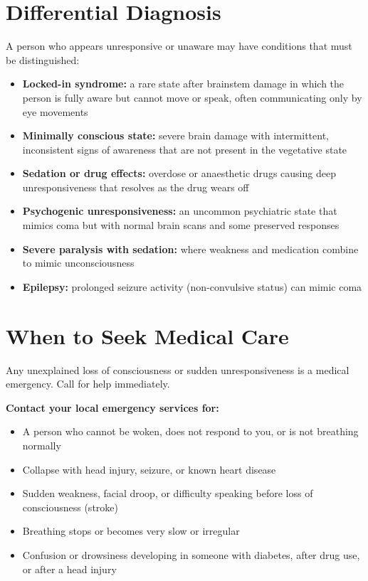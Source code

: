 \section*{Differential Diagnosis}
A person who appears unresponsive or unaware may have conditions that must be distinguished:

\begin{itemize}
    \item \textbf{Locked-in syndrome:} a rare state after brainstem damage in which the person is fully aware but cannot move or speak, often communicating only by eye movements
    \item \textbf{Minimally conscious state:} severe brain damage with intermittent, inconsistent signs of awareness that are not present in the vegetative state
    \item \textbf{Sedation or drug effects:} overdose or anaesthetic drugs causing deep unresponsiveness that resolves as the drug wears off
    \item \textbf{Psychogenic unresponsiveness:} an uncommon psychiatric state that mimics coma but with normal brain scans and some preserved responses
    \item \textbf{Severe paralysis with sedation:} where weakness and medication combine to mimic unconsciousness
    \item \textbf{Epilepsy:} prolonged seizure activity (non-convulsive status) can mimic coma
\end{itemize}

\section*{When to Seek Medical Care}
Any unexplained loss of consciousness or sudden unresponsiveness is a medical emergency. Call for help immediately.

\textbf{Contact your local emergency services for:}
\begin{itemize}
    \item A person who cannot be woken, does not respond to you, or is not breathing normally
    \item Collapse with head injury, seizure, or known heart disease
    \item Sudden weakness, facial droop, or difficulty speaking before loss of consciousness (stroke)
    \item Breathing stops or becomes very slow or irregular
    \item Confusion or drowsiness developing in someone with diabetes, after drug use, or after a head injury
\end{itemize}

